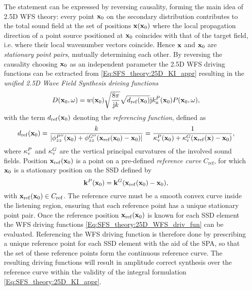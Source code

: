 The statement can be expressed by reversing causality, forming the main idea of 2.5D WFS theory: 
every point $\mathbf{x}_0$ on the secondary distribution contributes to the total sound field at the set of positions $\mathbf{x}(\mathbf{x}_0)$ where the local propagation direction of a point source positioned at $\mathbf{x}_0$ coincides with that of the target field, i.e. where their local wavenumber vectors coincide.
Hence $\mathbf{x}$ and $\mathbf{x}_0$ are \emph{stationary point pairs}, mutually determining each other.
By reversing the causality choosing $\mathbf{x}_0$ as an independent parameter the 2.5D WFS driving functions can be extracted from \eqref{Eq:SFS_theory:25D_KI_appr} resulting in the \emph{unified 2.5D Wave Field Synthesis driving functions}
\begin{equation}
D(\mathbf{x}_0, \omega) = w(\mathbf{x}_0) 
\sqrt{\frac{8\pi}{\mathrm{j} k}}\sqrt{d_{\mathrm{ref}}(\mathbf{x}_0)}
\mathrm{j} k_{\mathrm{n}}^P(\mathbf{x}_0) 	P(\mathbf{x}_0,\omega),
\label{Eq:SFS_theory:25D_WFS_driv_fun}
\end{equation}
with the term $d_{\mathrm{ref}}(\mathbf{x}_0)$ denoting the \emph{referencing function}, defined as
\begin{equation}
d_{\mathrm{ref}}(\mathbf{x}_0) = \frac{k}{|\phi^{P''}_{zz}(\mathbf{x}_0) +\phi^{G''}_{zz}(\mathbf{x}_{\mathrm{ref}}(\mathbf{x}_0)-\mathbf{x}_0)|} = \frac{1}{\kappa_\mathrm{v}^P(\mathbf{x}_0)+ \kappa_\mathrm{v}^G(\mathbf{x}_{\mathrm{ref}}(\mathbf{x})-\mathbf{x}_0)},
\end{equation}
where $\kappa_\mathrm{v}^P$ and $\kappa_\mathrm{v}^G$ are the vertical principal curvatures of the involved sound fields.
Position $\mathbf{x}_{\mathrm{ref}}(\mathbf{x}_0)$ is a point on a pre-defined \emph{reference curve} $C_{\mathrm{ref}}$, for which $\mathbf{x}_0$ is a stationary position on the SSD defined by
\begin{equation}
\mathbf{k}^P(\mathbf{x}_0) = \mathbf{k}^G(\mathbf{x}_{\mathrm{ref}}(\mathbf{x}_0) - \mathbf{x}_0),
\label{Eq:SFS_theory:WFS_General_Stat_pos}
\end{equation}
with $\mathbf{x}_{\mathrm{ref}}(\mathbf{x}_0) \in C_{\mathrm{ref}}$.
The reference curve must be a smooth convex curve inside the listening region, ensuring that each reference point has a unique stationary point pair.
Once the reference position $\mathbf{x}_{\mathrm{ref}}(\mathbf{x}_0)$ is known for each SSD element the WFS driving functions \eqref{Eq:SFS_theory:25D_WFS_driv_fun} can be evaluated.
Referencing the WFS driving function is therefore done by prescribing a unique reference point for each SSD element with the aid of the SPA, so that the set of these reference points form the continuous reference curve.
The resulting driving functions will result in amplitude correct synthesis over the reference curve within the validity of the integral formulation \eqref{Eq:SFS_theory:25D_KI_appr}.

